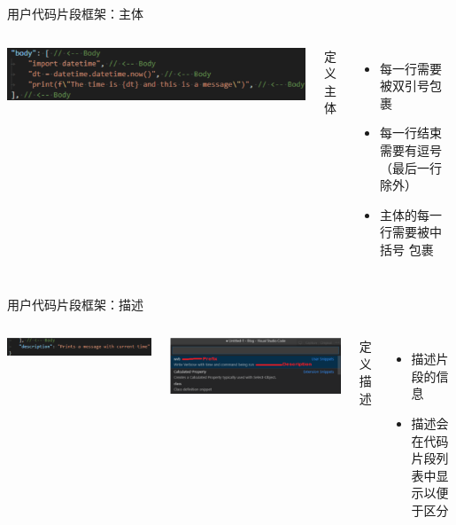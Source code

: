 \documentclass{beamer}
\begin{document}
\begin{frame}{用户代码片段框架：主体}
    \begin{columns}
        \begin{minipage}[c][\textheight][c]{\linewidth}
            \centering
            \includegraphics[scale=0.20]{pic/body.png}
        \end{minipage}
        定义主体
        \begin{itemize}
            \item 每一行需要被双引号包裹
            \item 每一行结束需要有逗号（最后一行除外）
            \item 主体的每一行需要被中括号 \text{[ ]}包裹
        \end{itemize}
    \end{columns}
\end{frame}

\begin{frame}{用户代码片段框架：描述}
    \begin{columns}
        \begin{minipage}[c][.2\textheight][c]{\linewidth}
            \centering
            \includegraphics[scale=0.22]{pic/description.png}
        \end{minipage}
        \begin{minipage}[c][.35\textheight][c]{\linewidth}
            \centering
            \includegraphics[scale=0.12]{pic/descritpin2.png}
        \end{minipage}
        定义描述
        \begin{itemize}
            \item 描述片段的信息
            \item 描述会在代码片段列表中显示以便于区分
        \end{itemize}
    \end{columns}
\end{frame}
\end{document}

